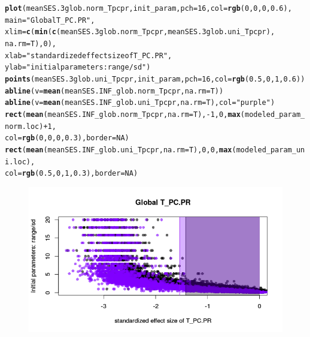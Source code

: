 \documentclass[12pt]{article}\usepackage[]{graphicx}\usepackage[]{color}
\makeatletter
\def\maxwidth{ %
  \ifdim\Gin@nat@width>\linewidth
    \linewidth
  \else
    \Gin@nat@width
  \fi
}
\newcommand{\hlnum}[1]{\textcolor[rgb]{0.686,0.059,0.569}{#1}}%
\newcommand{\hlstr}[1]{\textcolor[rgb]{0.192,0.494,0.8}{#1}}%
\newcommand{\hlopt}[1]{\textcolor[rgb]{0,0,0}{#1}}%
\newcommand{\hlstd}[1]{\textcolor[rgb]{0.345,0.345,0.345}{#1}}%
\newcommand{\hlkwc}[1]{\textcolor[rgb]{0.333,0.667,0.333}{#1}}%
\newcommand{\hlkwd}[1]{\textcolor[rgb]{0.737,0.353,0.396}{\textbf{#1}}}%
\newenvironment{kframe}{%
 \def\at@end@of@kframe{}%
 \ifinner\ifhmode%
  \def\at@end@of@kframe{\end{minipage}}%
  \begin{minipage}{\columnwidth}%
 \fi\fi%
 \def\FrameCommand##1{\hskip\@totalleftmargin \hskip-\fboxsep
 \colorbox{shadecolor}{##1}\hskip-\fboxsep
     \hskip-\linewidth \hskip-\@totalleftmargin \hskip\columnwidth}%
 \MakeFramed {\advance\hsize-\width
   \@totalleftmargin\z@ \linewidth\hsize
   \@setminipage}}%
 {\par\unskip\endMakeFramed%
 \at@end@of@kframe}
\newenvironment{knitrout}{}{} %
\makeatother
\begin{document}
\begin{knitrout}\small
{}\color{fgcolor}\begin{kframe}
\begin{alltt}
\hlkwd{plot}\hlstd{(meanSES.3glob.norm_Tpcpr, init_param,} \hlkwc{pch} \hlstd{=} \hlnum{16}\hlstd{,} \hlkwc{col} \hlstd{=} \hlkwd{rgb}\hlstd{(}\hlnum{0}\hlstd{,} \hlnum{0}\hlstd{,} \hlnum{0}\hlstd{,} \hlnum{0.6}\hlstd{),}
     \hlkwc{main} \hlstd{=} \hlstr{"Global T_PC.PR"}\hlstd{,}
     \hlkwc{xlim} \hlstd{=} \hlkwd{c}\hlstd{(}\hlkwd{min}\hlstd{(}\hlkwd{c}\hlstd{(meanSES.3glob.norm_Tpcpr, meanSES.3glob.uni_Tpcpr),}
            \hlkwc{na.rm} \hlstd{= T),} \hlnum{0}\hlstd{),}
     \hlkwc{xlab} \hlstd{=} \hlstr{"standardized effect size of T_PC.PR"}\hlstd{,}
     \hlkwc{ylab} \hlstd{=} \hlstr{"initial parameters: range/sd"}\hlstd{)}
\hlkwd{points}\hlstd{(meanSES.3glob.uni_Tpcpr, init_param,} \hlkwc{pch} \hlstd{=} \hlnum{16}\hlstd{,} \hlkwc{col} \hlstd{=} \hlkwd{rgb}\hlstd{(}\hlnum{0.5}\hlstd{,} \hlnum{0}\hlstd{,} \hlnum{1}\hlstd{,} \hlnum{0.6}\hlstd{))}
\hlkwd{abline}\hlstd{(}\hlkwc{v} \hlstd{=} \hlkwd{mean}\hlstd{(meanSES.INF_glob.norm_Tpcpr,} \hlkwc{na.rm} \hlstd{= T))}
\hlkwd{abline}\hlstd{(}\hlkwc{v} \hlstd{=} \hlkwd{mean}\hlstd{(meanSES.INF_glob.uni_Tpcpr,} \hlkwc{na.rm} \hlstd{= T),} \hlkwc{col} \hlstd{=} \hlstr{"purple"}\hlstd{)}
\hlkwd{rect}\hlstd{(}\hlkwd{mean}\hlstd{(meanSES.INF_glob.norm_Tpcpr,} \hlkwc{na.rm} \hlstd{= T),} \hlopt{-}\hlnum{1}\hlstd{,} \hlnum{0}\hlstd{,} \hlkwd{max}\hlstd{(modeled_param_norm.loc)} \hlopt{+} \hlnum{1}\hlstd{,}
     \hlkwc{col} \hlstd{=} \hlkwd{rgb}\hlstd{(}\hlnum{0}\hlstd{,} \hlnum{0}\hlstd{,} \hlnum{0}\hlstd{,} \hlnum{0.3}\hlstd{),} \hlkwc{border} \hlstd{=} \hlnum{NA}\hlstd{)}
\hlkwd{rect}\hlstd{(}\hlkwd{mean}\hlstd{(meanSES.INF_glob.uni_Tpcpr,} \hlkwc{na.rm} \hlstd{= T),} \hlnum{0}\hlstd{,} \hlnum{0}\hlstd{,} \hlkwd{max}\hlstd{(modeled_param_uni.loc),}
     \hlkwc{col} \hlstd{=} \hlkwd{rgb}\hlstd{(}\hlnum{0.5}\hlstd{,} \hlnum{0}\hlstd{,} \hlnum{1}\hlstd{,} \hlnum{0.3}\hlstd{),} \hlkwc{border} \hlstd{=} \hlnum{NA}\hlstd{)}
\end{alltt}
\end{kframe}\begin{figure}

{\centering \includegraphics[width=\maxwidth]{figure/External_filter_Results_plots_initial_param2-1} 

}
\end{figure}
\end{knitrout}
\end{document}
